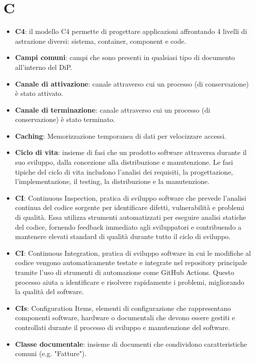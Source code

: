 \documentclass[a4paper,12pt]{article}
\begin{document}
\section{C}
\begin{itemize}
    \item \textbf{C4}: il modello C4 permette di progettare applicazioni affrontando 4 livelli di astrazione diversi: sistema, container, component e code. 
    \item \textbf{Campi comuni}: campi che sono presenti in qualsiasi tipo di documento all'interno del DiP.
    \item \textbf{Canale di attivazione}: canale attraverso cui un processo (di conservazione) è stato attivato.
    \item \textbf{Canale di terminazione}: canale attraverso cui un processo (di conservazione) è stato terminato.
    \item \textbf{Caching}: Memorizzazione temporanea di dati per velocizzare accessi.
    \item \textbf{Ciclo di vita}: insieme di fasi che un prodotto software attraversa durante il suo sviluppo, dalla concezione alla distribuzione e manutenzione. Le fasi tipiche del ciclo di vita includono l'analisi dei requisiti, la progettazione, l'implementazione, il testing, la distribuzione e la manutenzione.
    \item \textbf{CI}: Continuous Inspection, pratica di sviluppo software che prevede l'analisi continua del codice sorgente per identificare difetti, vulnerabilità e problemi di qualità. Essa utilizza strumenti automatizzati per eseguire analisi statiche del codice, fornendo feedback immediato agli sviluppatori e contribuendo a mantenere elevati standard di qualità durante tutto il ciclo di sviluppo.
    \item \textbf{CI}: Continuous Integration, pratica di sviluppo software in cui le modifiche al codice vengono automaticamente testate e integrate nel repository principale tramite l'uso di strumenti di automazione come GitHub Actions. Questo processo aiuta a identificare e risolvere rapidamente i problemi, migliorando la qualità del software.
    \item \textbf{CIs}: Configuration Items, elementi di configurazione che rappresentano componenti software, hardware o documentali che devono essere gestiti e controllati durante il processo di sviluppo e manutenzione del software.
    \item \textbf{Classe documentale}: insieme di documenti che condividono caratteristiche comuni (e.g. "Fatture").

\end{itemize}
\end{document}
